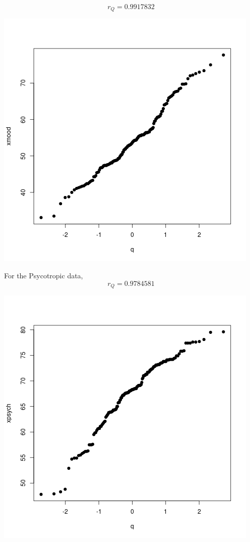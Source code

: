 \documentclass[letterpaper,10pt]{article}
\begin{document}
\begin{enumerate}
\[r_Q=0.9917832\]
\begin{center}
\includegraphics[scale=.5]{moodq.png}
\end{center}
For the Psycotropic data,
\[r_Q=0.9784581\]
\begin{center}
\includegraphics[scale=.5]{psychq.png}

\end{center}
\end{enumerate}
\end{document}
